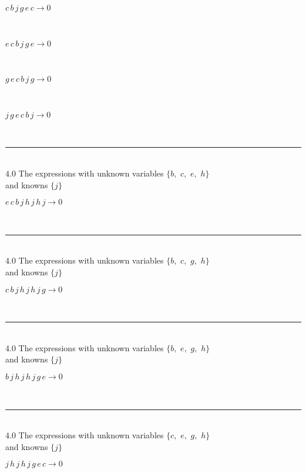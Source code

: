\documentclass[rep10,leqno]{report}
\begin{document}
\begin{minipage}{6in}
$
c\,
 b\,
 j\,
 g\,
 e\,
 c\rightarrow 0
$
\end{minipage}\medskip \\
\begin{minipage}{6in}
$
e\,
 c\,
 b\,
 j\,
 g\,
 e\rightarrow 0
$
\end{minipage}\medskip \\
\begin{minipage}{6in}
$
g\,
 e\,
 c\,
 b\,
 j\,
 g\rightarrow 0
$
\end{minipage}\medskip \\
\begin{minipage}{6in}
$
j\,
 g\,
 e\,
 c\,
 b\,
 j\rightarrow 0
$
\end{minipage}\\
\rule[3pt]{6in}{.7pt}\\
$4.0$  The expressions with unknown variables $\{b,
$ $
c,
$ $
e,
$ $
h\}$\\
and knowns $\{j\}$\smallskip\\
\begin{minipage}{6in}
$
e\,
 c\,
 b\,
 j\,
 h\,
 j\,
 h\,
 j\rightarrow 0
$
\end{minipage}\\
\rule[3pt]{6in}{.7pt}\\
$4.0$  The expressions with unknown variables $\{b,
$ $
c,
$ $
g,
$ $
h\}$\\
and knowns $\{j\}$\smallskip\\
\begin{minipage}{6in}
$
c\,
 b\,
 j\,
 h\,
 j\,
 h\,
 j\,
 g\rightarrow 0
$
\end{minipage}\\
\rule[3pt]{6in}{.7pt}\\
$4.0$  The expressions with unknown variables $\{b,
$ $
e,
$ $
g,
$ $
h\}$\\
and knowns $\{j\}$\smallskip\\
\begin{minipage}{6in}
$
b\,
 j\,
 h\,
 j\,
 h\,
 j\,
 g\,
 e\rightarrow 0
$
\end{minipage}\\
\rule[3pt]{6in}{.7pt}\\
$4.0$  The expressions with unknown variables $\{c,
$ $
e,
$ $
g,
$ $
h\}$\\
and knowns $\{j\}$\smallskip\\
\begin{minipage}{6in}
$
j\,
 h\,
 j\,
 h\,
 j\,
 g\,
 e\,
 c\rightarrow 0
$
\end{minipage}\\
\end{document}
